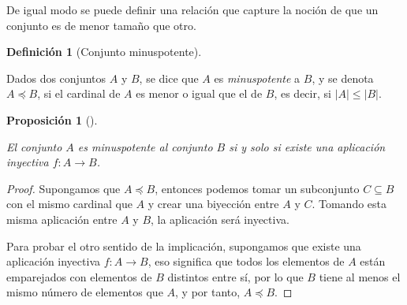 \documentclass[
  a4paper,
]{scrreport}
\theoremstyle{definition}
\newtheorem{definition}{Definición}[chapter]
\theoremstyle{plain}
\theoremstyle{plain}
\newtheorem{proposition}{Proposición}[chapter]
\theoremstyle{definition}
\theoremstyle{definition}
\theoremstyle{plain}
\theoremstyle{remark}
\begin{document}
De igual modo se puede definir una relación que capture la noción de que
un conjunto es de menor tamaño que otro.

\begin{definition}[Conjunto
minuspotente]\protect\hypertarget{def-conjuntos-minuspotentes}{}\label{def-conjuntos-minuspotentes}

Dados dos conjuntos \(A\) y \(B\), se dice que \(A\) es
\emph{minuspotente} a \(B\), y se denota \(A\preceq B\), si el cardinal
de \(A\) es menor o igual que el de \(B\), es decir, si
\(|A| \leq |B|\).

\end{definition}

\begin{proposition}[]\protect\hypertarget{prp-inyeccion-conjuntos-minuspotentes}{}\label{prp-inyeccion-conjuntos-minuspotentes}

El conjunto \(A\) es minuspotente al conjunto \(B\) si y solo si existe
una aplicación inyectiva \(f:A\rightarrow B\).

\end{proposition}

\begin{tcolorbox}[enhanced jigsaw, breakable, title=\textcolor{quarto-callout-note-color}{\faInfo}\hspace{0.5em}{Demostración}, toprule=.15mm, coltitle=black, arc=.35mm, rightrule=.15mm, colframe=quarto-callout-note-color-frame, colbacktitle=quarto-callout-note-color!10!white, toptitle=1mm, titlerule=0mm, leftrule=.75mm, opacityback=0, colback=white, bottomrule=.15mm, bottomtitle=1mm, left=2mm, opacitybacktitle=0.6]

\begin{proof}

Supongamos que \(A\preceq B\), entonces podemos tomar un subconjunto
\(C\subseteq B\) con el mismo cardinal que \(A\) y crear una biyección
entre \(A\) y \(C\). Tomando esta misma aplicación entre \(A\) y \(B\),
la aplicación será inyectiva.

Para probar el otro sentido de la implicación, supongamos que existe una
aplicación inyectiva \(f:A\longrightarrow B\), eso significa que todos
los elementos de \(A\) están emparejados con elementos de \(B\)
distintos entre sí, por lo que \(B\) tiene al menos el mismo número de
elementos que \(A\), y por tanto, \(A\preceq B\).

\end{proof}

\end{tcolorbox}
\end{document}
